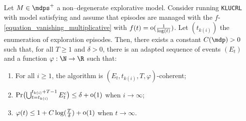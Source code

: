 \documentclass[preprint,cleveref,12pt]{colt2025}
\DeclarePairedDelimiter{\parens}{(}{)}	%
\DeclareMathOperator*{\oh}{\mathrm{o}}
\def\model{\mdp}
\def\models{\mdps}
\begin{document}
    \begin{lemma}
    \label{lemma_local_coherence}
        Let $M \in \models^+$ a non--degenerate explorative model.
        Consider running \texttt{KLUCRL} with model satisfying  and assume that episodes are managed with the $f$-\eqref{equation_vanishing_multiplicative} with $f(t) = \oh\parens{\frac 1{\log(t)}}$.
        Let $(t_{k(i)})$ the enumeration of exploration episodes. 
        Then, there exists a constant $C(\model) > 0$ such that, for all $T \ge 1$ and $\delta > 0$, there is an adapted sequence of events $(E_t)$ and a function $\varphi : \N \to \R$ such that:
        \begin{enumerate}
            \item 
                For all $i \ge 1$, the algorithm is $(E_t, t_{k(i)}, T, \varphi)$-coherent;
                \vspace{-.66em}
            \item 
                $\Pr\parens[\big]{\bigcup_{t=t_{k(i)}}^{t_{k(i)}+T-1} E_t^c} \le \delta + \oh(1)$ when $i \to \infty$;
                \vspace{-.66em}
            \item 
                $\varphi(t) \le 1 + C \log\parens{\frac T\delta} + \oh(1)$ when $t \to \infty$.
        \end{enumerate}
    \end{lemma}
\end{document}
